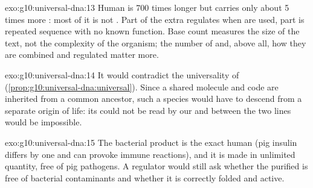 \begin{solution}{exo:g10:universal-dna:13}
Human  is 700 times longer but carries only about 5 times more
: most of it is not . Part of the extra  regulates when
 are used, part is repeated sequence with no known function. Base
count measures the size of the text, not the complexity of the
organism; the number of  and, above all, how they are combined
and regulated matter more.
\end{solution}

\begin{solution}{exo:g10:universal-dna:14}
It would contradict the universality of 
(\cref{prop:g10:universal-dna:universal}). Since a shared molecule and
code are inherited from a common ancestor, such a species would have to
descend from a separate origin of life: its  could not be read
by our  and  between the two lines would be
impossible.
\end{solution}

\begin{solution}{exo:g10:universal-dna:15}
The bacterial product is the exact human  (pig insulin differs
by one  and can provoke immune reactions), and it is made in
unlimited quantity, free of pig pathogens. A regulator would still ask
whether the purified  is free of bacterial contaminants and
whether it is correctly folded and active.
\end{solution}

